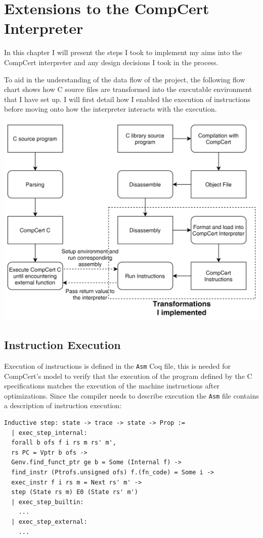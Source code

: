 
\chapter{Extensions to the CompCert Interpreter}\label{ccomp}
In this chapter I will present the steps I took to implement my aims into the CompCert interpreter and any design decisions I took in the process. 

To aid in the understanding of the data flow of the project, the following flow chart shows how C source files are transformed into the executable environment that I have set up. I will first detail how I enabled the execution of instructions before moving onto how the interpreter interacts with the execution.

\includegraphics[width=\textwidth]{data_flow.png}

\section{Instruction Execution}\label{execution}
Execution of instructions is defined in the \texttt{Asm} Coq file, this is needed for CompCert's model to verify that the execution of the program defined by the C specifications matches the execution of the machine instructions after optimizations. Since the compiler needs to describe execution the \texttt{Asm} file contains a description of instruction execution:

\begin{lstlisting}[language=Coq]
Inductive step: state -> trace -> state -> Prop :=
  | exec_step_internal:
  forall b ofs f i rs m rs' m',
  rs PC = Vptr b ofs ->
  Genv.find_funct_ptr ge b = Some (Internal f) ->
  find_instr (Ptrofs.unsigned ofs) f.(fn_code) = Some i ->
  exec_instr f i rs m = Next rs' m' ->
  step (State rs m) E0 (State rs' m')
  | exec_step_builtin:
    ...
  | exec_step_external:
    ...
\end{lstlisting}

